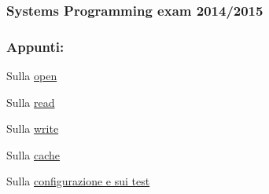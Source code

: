 \subsubsection*{Systems Programming exam 2014/2015}

\subsubsection*{Appunti\+:}


\begin{DoxyItemize}
\item Sulla \hyperlink{md_OPE}{open}
\item Sulla \hyperlink{md_READ}{read}
\item Sulla \hyperlink{md_WRITE}{write}
\item Sulla \hyperlink{md_Cache}{cache}
\item Sulla \hyperlink{md_Test}{configurazione e sui test} 
\end{DoxyItemize}